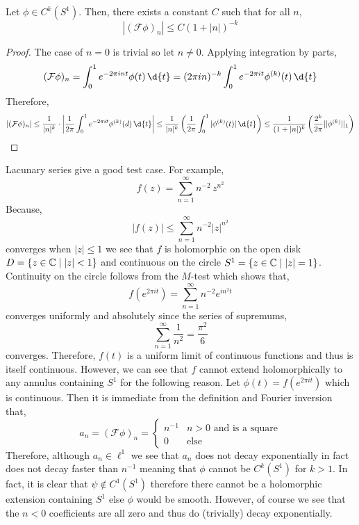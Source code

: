 \documentclass[12pt]{article}
\renewcommand{\F}{\mathcal{F}}
\begin{document}
\begin{prop}
Let $\phi \in C^k(S^1)$. Then, there exists a constant $C$ such that for all $n$,
\[ |(\F \phi)_n| \le C (1 + |n|)^{-k} \]
\end{prop}

\begin{proof}
The case of $n = 0$ is trivial so let $n \neq 0$. Applying integration by parts,
\[ (\F \phi)_n = \int_0^1 e^{-2 \pi i n t} \phi(t) \, \d{t} = (2 \pi i n)^{-k} \int_0^1 e^{- 2 \pi i t} \phi^{(k)}(t) \, \d{t} \]
Therefore,
\[ |(\F \phi)_n| \le \frac{1}{|n|^{k}} \cdot \left| \frac{1}{2 \pi} \int_0^1 e^{-2 \pi i t} \phi^{(k)}(d) \, \d{t} \right| \le \frac{1}{|n|^{k}} \left( \frac{1}{2 \pi} \int_0^1 |\phi^{(k)}(t)| \, \d{t} \right) \le  \frac{1}{(1 + |n|)^k} \left( \frac{2^k}{2 \pi} || \phi^{(k)} ||_1 \right) \]
\end{proof}

\begin{example}
Lacunary series give a good test case. For example,
\[ f(z) = \sum_{n = 1}^\infty n^{-2} \, z^{n^2} \]
Because,
\[ |f(z)| \le \sum_{n = 1}^\infty n^{-2} |z|^{n^2} \]
converges when $|z| \le 1$ we see that $f$ is holomorphic on the open disk $D = \{ z \in \mathbb{C} \mid |z| < 1 \}$ and continuous on the circle $S^1 = \{ z \in \mathbb{C} \mid |z| = 1 \}$. Continuity on the circle follows from the $M$-test which shows that,
\[ f(e^{2 \pi it}) = \sum_{n = 1}^\infty n^{-2} e^{i n^2 t} \]
converges uniformly and absolutely since the series of supremums,
\[ \sum_{n = 1}^\infty \frac{1}{n^2} = \frac{\pi^2}{6} \]
converges. Therefore, $f(t)$ is a uniform limit of continuous functions and thus is itself continuous. However, we can see that $f$ cannot extend holomorphically to any annulus containing $S^1$ for the following reason. Let $\phi(t) = f(e^{2 \pi i t})$ which is continuous. Then it is immediate from the definition and Fourier inversion that,
\[ a_n = (\F \phi)_n = 
\begin{cases}
n^{-1} & n > 0 \text{ and is a square}
\\
0 & \text{else}
\end{cases} \] 
Therefore, although $a_n \in \ell^1$ we see that $a_n$ does not decay exponentially in fact does not decay faster than $n^{-1}$ meaning that $\phi$ cannot be $C^k(S^1)$ for $k > 1$. In fact, it is clear that $\psi \notin C^1(S^1)$ therefore there cannot be a holomorphic extension containing $S^1$ else $\phi$ would be smooth. However, of course we see that the $n < 0$ coefficients are all zero and thus do (trivially) decay exponentially.
\end{example}
\end{document}
